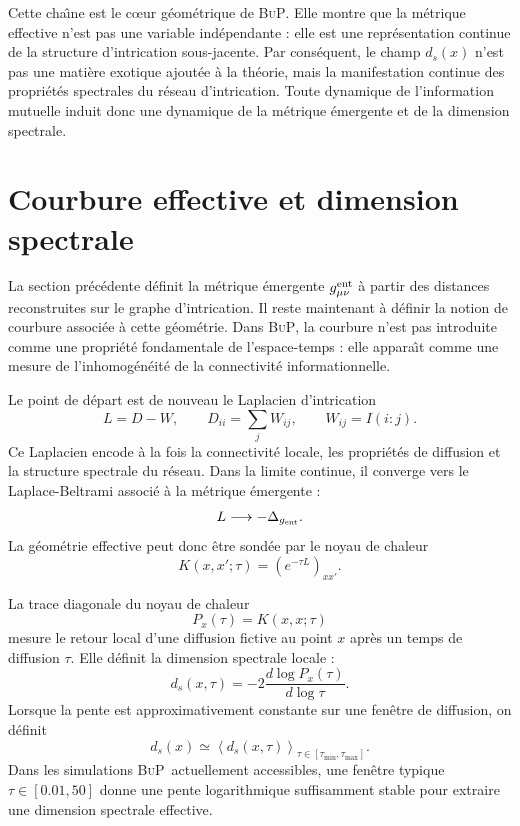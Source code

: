 \documentclass[11pt]{article}
\newcommand{\BuP}{\textsc{BuP}}
\begin{document}
Cette cha\^{\i}ne est le c\oe{}ur g\'eom\'etrique de \BuP. Elle montre que la m\'etrique
effective n'est pas une variable ind\'ependante : elle est une repr\'esentation continue
de la structure d'intrication sous-jacente. Par cons\'equent, le champ $d_s(x)$ n'est
pas une mati\`ere exotique ajout\'ee \`a la th\'eorie, mais la manifestation continue
des propri\'et\'es spectrales du r\'eseau d'intrication. Toute dynamique de l'information
mutuelle induit donc une dynamique de la m\'etrique \'emergente et de la dimension
spectrale.

\section{Courbure effective et dimension spectrale}
\label{sec:curvature}

La section pr\'ec\'edente d\'efinit la m\'etrique \'emergente $g_{\mu\nu}^{\rm ent}$
\`a partir des distances reconstruites sur le graphe d'intrication. Il reste maintenant
\`a d\'efinir la notion de courbure associ\'ee \`a cette g\'eom\'etrie. Dans \BuP, la
courbure n'est pas introduite comme une propri\'et\'e fondamentale de l'espace-temps :
elle appara\^{\i}t comme une mesure de l'inhomog\'en\'eit\'e de la connectivit\'e
informationnelle.

Le point de d\'epart est de nouveau le Laplacien d'intrication
\[
L = D-W,
\qquad
D_{ii}=\sum_j W_{ij},
\qquad
W_{ij}=I(i:j).
\]
Ce Laplacien encode \`a la fois la connectivit\'e locale, les propri\'et\'es de diffusion
et la structure spectrale du r\'eseau. Dans la limite continue, il converge vers
le Laplace-Beltrami associ\'e \`a la m\'etrique \'emergente :
\[
L\longrightarrow -\Delta_{g_{\rm ent}}.
\]
La g\'eom\'etrie effective peut donc \^etre sond\'ee par le noyau de chaleur
\[
K(x,x';\tau)
=
\left(e^{-\tau L}\right)_{x x'}.
\]

La trace diagonale du noyau de chaleur
\[
P_x(\tau)=K(x,x;\tau)
\]
mesure le retour local d'une diffusion fictive au point $x$ apr\`es un temps de
diffusion $\tau$. Elle d\'efinit la dimension spectrale locale :
\[
d_s(x,\tau)
=
-2\frac{d\log P_x(\tau)}{d\log\tau}.
\]
Lorsque la pente est approximativement constante sur une fen\^etre de diffusion, on
d\'efinit
\[
d_s(x)
\simeq
\left\langle
d_s(x,\tau)
\right\rangle_{\tau\in[\tau_{\min},\tau_{\max}]}.
\]
Dans les simulations \BuP\ actuellement accessibles, une fen\^etre typique
$\tau\in[0.01,50]$ donne une pente logarithmique suffisamment stable pour extraire
une dimension spectrale effective.
\end{document}
